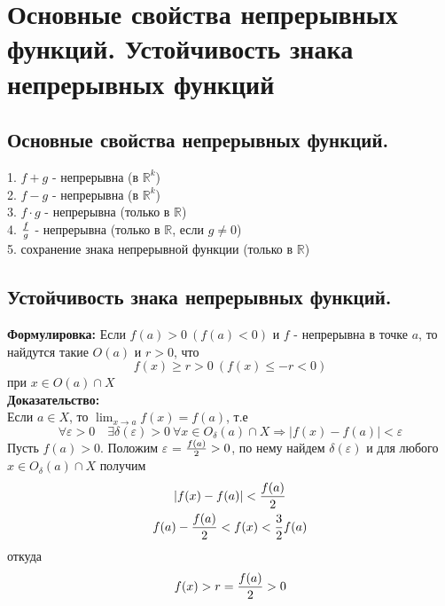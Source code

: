 \section{Основные свойства непрерывных функций. Устойчивость знака непрерывных функций}
\subsection{Основные свойства непрерывных функций.}
1. $f + g$ - непрерывна (в $\mathbb{R}^{k}$)\\
2. $f - g$ - непрерывна (в $\mathbb{R}^{k}$)\\
3. $f \cdot g$ - непрерывна (только в $\mathbb{R}$)\\
4. $f \over g$ - непрерывна (только в $\mathbb{R}$, если $g \neq 0 $) \\
5. сохранение знака непрерывной функции (только в $\mathbb{R}$)

\subsection{Устойчивость знака непрерывных функций.}
\textbf{Формулировка:}
Если $f(a) > 0 \ (f(a) < 0 )$ и $f$ - непрерывна в точке $a$, то найдутся такие $O(a)$ и $r>0$, что\\
$$
f(x) \geq r > 0 \ (f(x) \leq -r < 0)
$$
при $x \in O(a) \cap X$\\
\textbf{Доказательство:}\\
Если $a \in X$, то $\lim_{x\to a}{f(x)} = f(a)$, т.е
$$
\forall \varepsilon>0 \quad \exists \delta(\varepsilon)>0 \ \forall x \in O_{\delta}(a) \cap X
\Rightarrow |f(x)- f(a)| < \varepsilon
$$
Пусть $f(a)>0$. Положим $\varepsilon$ = ${f(a)\over 2} > 0$, по нему найдем $\delta(\varepsilon)$ и для любого $x \in O_{\delta}(a) \cap X$ получим
\begin{equation*}
\begin{gathered}
|f(x) - f(a)| < {f(a)\over 2}\\
f(a) - {f(a)\over 2} < f(x) < {3\over 2} f(a)\\
\end{gathered}
\end{equation*}
откуда
$$
f(x)> r = {f(a)\over 2} > 0
$$